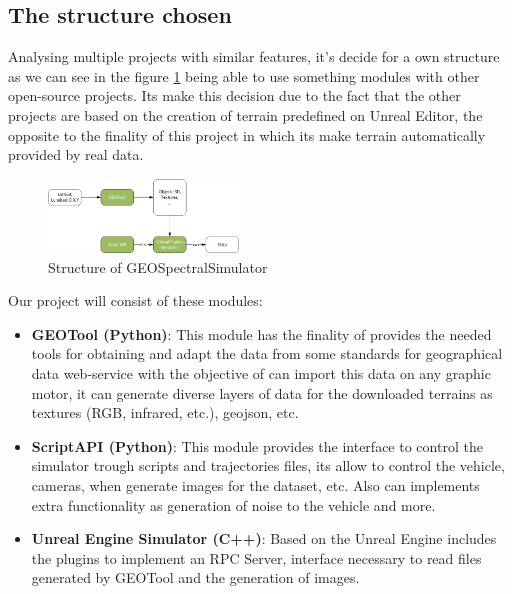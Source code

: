 \documentclass[10pt,a4paper,twocolumn,twoside]{article}
\begin{document}
\subsection{The structure chosen}

Analysing multiple projects with similar features, it's decide for a own structure as we can see in the figure \ref{fig-dronsimulatormodules} being able to use something modules with other open-source projects. Its make this decision due to the fact that the other projects are based on the creation of terrain predefined on Unreal Editor, the opposite to the finality of this project in which its make terrain automatically provided by real data.

\begin{figure}[!h]
\centering
  	\includegraphics[width=0.45\textwidth]{structuretfg}
	\caption{Structure of GEOSpectralSimulator}
	\label{fig-dronsimulatormodules}
\end{figure}

Our project will consist of these modules:

\begin{itemize}
  \item \textbf{GEOTool (Python)}: This module has the finality of provides the needed tools for obtaining and adapt the data from some standards for geographical data web-service with the objective of can import this data on any graphic motor, it can generate diverse layers of data for the downloaded terrains as textures (RGB, infrared, etc.), geojson, etc. 
  
  \item \textbf{ScriptAPI (Python)}: This module provides the interface to control the simulator trough scripts and trajectories files, its allow to control the vehicle, cameras, when generate images for the dataset, etc. Also can implements extra functionality as generation of noise to the vehicle and more.
  
  \item \textbf{Unreal Engine Simulator (C++)}: Based on the Unreal Engine includes the plugins to implement an RPC Server, interface necessary to read files generated by GEOTool and the generation of images.
\end{itemize}
\end{document}
